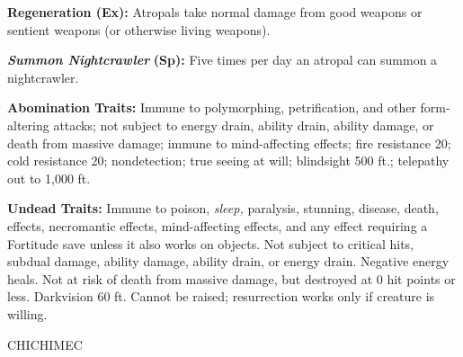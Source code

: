 \documentclass{article}
\begin{document}
\textbf{Regeneration (Ex):} Atropals take normal damage from good weapons or sentient 
weapons (or otherwise living weapons). 

\textit{\textbf{Summon Nightcrawler }}\textbf{(Sp): }Five times per day an atropal 
can summon a nightcrawler. 

\textbf{Abomination Traits:} Immune to polymorphing, petrification, and other form-altering 
attacks; not subject to energy drain, ability drain, ability damage, or death from 
massive damage; immune to mind-affecting effects; fire resistance 20; cold resistance 
20; nondetection; true seeing at will; blindsight 500 ft.; telepathy out to 1,000 
ft. 

\textbf{Undead Traits:} Immune to poison, \textit{sleep, }paralysis, stunning, 
disease, death, effects, necromantic effects, mind-affecting effects, and any effect 
requiring a Fortitude save unless it also works on objects. Not subject to critical 
hits, subdual damage, ability damage, ability drain, or energy drain. Negative 
energy heals. Not at risk of death from massive damage, but destroyed at 0 hit 
points or less. Darkvision 60 ft. Cannot be raised; resurrection works only if 
creature is willing. 

\vspace{12pt}
{\LARGE{}CHICHIMEC}
\end{document}

